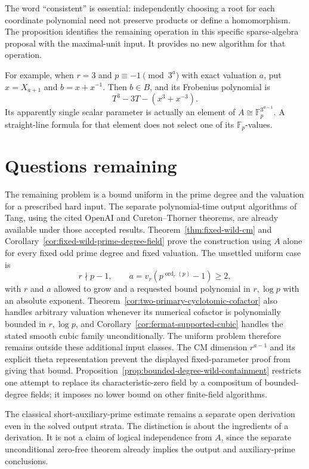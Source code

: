 \documentclass[11pt]{article}
\theoremstyle{definition}
\theoremstyle{remark}
\begin{document}
The word ``consistent'' is essential: independently choosing
a root for each coordinate polynomial need not preserve
products or define a homomorphism. The proposition identifies
the remaining operation in this specific sparse-algebra
proposal with the maximal-unit input. It provides no new
algorithm for that operation.

For example, when \(r=3\) and \(p\equiv-1\pmod{3^a}\)
with exact valuation \(a\), put \(x=X_{a+1}\) and
\(b=x+x^{-1}\). Then \(b\in B\), and its Frobenius
polynomial is
\[
               T^3-3T-(x^3+x^{-3}).
\]
Its apparently single scalar parameter is actually an
element of \(A\cong\mathbb F_p^{3^{a-1}}\).
A straight-line formula for that element does not select
one of its \(\mathbb F_p\)-values.


\section{Questions remaining}
The remaining problem is a bound uniform in the prime degree and
the valuation for a prescribed hard input. The separate polynomial-time
output algorithms of Tang, using the cited OpenAI and Cureton--Thorner
theorems, are already available under those accepted results.
Theorem~\ref{thm:fixed-wild-cm} and
Corollary~\ref{cor:fixed-wild-prime-degree-field} prove the
construction using \(A\) alone for every fixed odd prime degree
and fixed valuation. The unsettled uniform case is
\[
 r\nmid p-1,\qquad a=v_r(p^{\operatorname{ord}_r(p)}-1)\ge2,
\]
with \(r\) and \(a\) allowed to grow and a requested bound
polynomial in \(r,\log p\) with an absolute exponent.
Theorem~\ref{cor:two-primary-cyclotomic-cofactor} also handles arbitrary
valuation whenever its numerical cofactor is polynomially bounded
in \(r,\log p\), and Corollary~\ref{cor:fermat-supported-cubic}
handles the stated smooth cubic family unconditionally. The uniform
problem therefore remains outside these additional input classes.
The CM dimension \(r^{a-1}\) and its explicit theta representation
prevent the displayed fixed-parameter proof from giving that bound.
Proposition~\ref{prop:bounded-degree-wild-containment} restricts
one attempt to replace its characteristic-zero field by a compositum
of bounded-degree fields; it imposes no lower bound on other
finite-field algorithms.

The classical short-auxiliary-prime estimate remains a separate open
derivation even in the solved output strata. The distinction is about
the ingredients of a derivation. It is not a claim of logical
independence from \(A\), since the separate unconditional zero-free
theorem already implies the output and auxiliary-prime conclusions.
\end{document}
